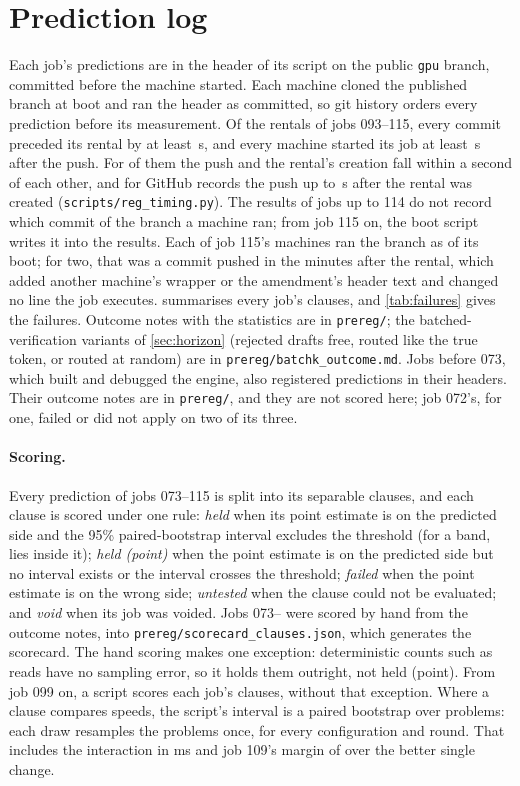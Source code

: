 \section{Prediction log}\label{app:prereg}
Each job's predictions are in the header of its script on the public \texttt{gpu} branch, committed before the machine
started. Each machine cloned the published branch at boot and ran the header as committed, so git history orders every
prediction before its measurement. Of the \rtRentals{} rentals of jobs 093--115, every commit preceded its rental by
at least \rtCommitMin\,s, and every machine started its job at least \rtMinLag\,s after the push. For \rtNear{} of
them the push and the rental's creation fall within a second of each other, and for \rtAfter{} GitHub records the push
up to \rtAfterMax\,s after the rental was created (\texttt{scripts/reg\_timing.py}). The results of jobs up to 114 do
not record which commit of the branch a machine ran; from job 115 on, the boot script writes it into the results. Each of
job 115's machines ran the branch as of its boot; for two, that was a commit pushed in the minutes after the rental,
which added another machine's wrapper or the amendment's header text and changed no line the job executes.  summarises
every job's clauses, and \cref{tab:failures} gives the failures. Outcome notes with the statistics are in
\texttt{prereg/}; the batched-verification variants of \cref{sec:horizon} (rejected drafts free, routed like the true
token, or routed at random) are in \texttt{prereg/batchk\_outcome.md}. Jobs before 073, which built and debugged the
engine, also registered predictions in their headers. Their outcome notes are in \texttt{prereg/}, and they are not
scored here; job 072's, for one, failed or did not apply on two of its three.

\paragraph{Scoring.} Every prediction of jobs 073--115 is split into its separable clauses, and each clause is scored
under one rule: \emph{held} when its point estimate is on the predicted side and the 95\% paired-bootstrap interval
excludes the threshold (for a band, lies inside it); \emph{held (point)} when the point estimate is on the predicted
side but no interval exists or the interval crosses the threshold; \emph{failed} when the point estimate is on the
wrong side; \emph{untested} when the clause could not be evaluated; and \emph{void} when its job was voided. Jobs
073--\scLastJob{} were scored by hand from the outcome notes, into \texttt{prereg/scorecard\_clauses.json}, which
generates the scorecard. The hand scoring makes one exception: deterministic counts such as reads have no sampling
error, so it holds them outright, not held (point). From job 099 on, a script scores each job's clauses, without that
exception. Where a clause compares speeds, the script's interval is a paired bootstrap over problems: each draw
resamples the problems once, for every configuration and round. That includes the interaction in ms and job 109's
margin of \MinOne{} over the better single change.

